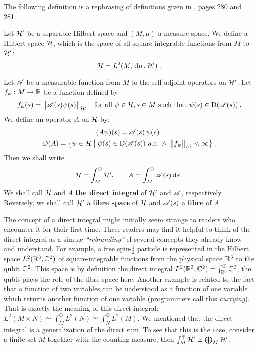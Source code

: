 The following definition is a rephrasing of definitions given in \cite{ReedSimon4}, pages 280 and 281.
\begin{defn}
    \label{defn-direct-integral}
    Let $\mathcal{H}'$ be a separable Hilbert space and $(M, \mu)$ a measure space. We define a Hilbert space $\mathcal{H}$, which is the space of all square-integrable functions from $M$ to $\mathcal{H}'$:
    \begin{equation*}
        \mathcal{H} = L^2(M, \, \mathrm{d}\mu \,, \mathcal{H}') \: .
    \end{equation*}

    Let $\mathscr{A}$ be a measurable function from $M$ to the self-adjoint operators on $\mathcal{H}'$. Let $f_\psi: M \to \mathbb{R}$ be a function defined by
    \begin{align*}
        f_\psi(s) = \big\lVert \mathscr{A}(s) \psi(s) \big\rVert_{\mathcal{H}'}
        \quad
        \text{for all } \psi \in \mathcal{H}, s \in M \text{ such that } \psi(s) \in \mathrm{D}(\mathscr{A}(s)) \: .
    \end{align*}
    We define an operator $A$ on $\mathcal{H}$ by:
    \begin{gather*}
        (A \psi)(s) = \mathscr{A}(s) \, \psi(s) \: , \\
        \mathrm{D}(A) = \big\{
            \psi \in \mathcal{H}
            \; \big| \;
            \psi(s) \in \mathrm{D}(\mathscr{A}(s)) \text{ a.e.}
            \; \wedge \;
            \big\lVert f_\psi \big\rVert_{L^2} < \infty
        \big\} \: .
    \end{gather*}
    Then we shall write
    \begin{gather*}
        \mathcal{H} = \int^\oplus_M \mathcal{H}', \qquad
        A = \int^\oplus_M \mathscr{A}(s) \, \mathrm{d}s \,.
    \end{gather*}
    We shall call $\mathcal{H}$ and $A$ \textbf{the direct integral} of $\mathcal{H}'$ and $\mathscr{A}$, respectively. Reversely, we shall call $\mathcal{H}'$ a \textbf{fibre space} of $\mathcal{H}$ and $\mathscr{A}(s)$ a \textbf{fibre} of $A$.
\end{defn}

The concept of a direct integral might initially seem strange to readers who encounter it for their first time. These readers may find it helpful to think of the direct integral as a simple \textit{“rebranding”} of several concepts they already know and understand. For example, a free spin-$\frac{1}{2}$ particle is represented in the Hilbert space $L^2(\mathbb{R}^3, \mathbb{C}^2)$ of square-integrable functions from the physical space $\mathbb{R}^3$ to the qubit $\mathbb{C}^2$. This space is by definition the direct integral $L^2(\mathbb{R}^3, \mathbb{C}^2) = \int_{\mathbb{R}^3}^\oplus \mathbb{C}^2$, the qubit plays the role of the fibre space here. Another example is related to the fact that a function of two variables can be understood as a function of one variable which returns another function of one variable (programmers call this \textit{currying}). That is exactly the meaning of this direct integral: $L^2(M\times N) \simeq \int_M^\oplus L^2(N) \simeq \int_N^\oplus L^2(M)$. We mentioned that the direct integral is a generalization of the direct sum. To see that this is the case, consider a finite set $M$ together with the counting measure, then $\int^\oplus_M \mathcal{H}' \simeq \bigoplus_{M} \mathcal{H}'$.

